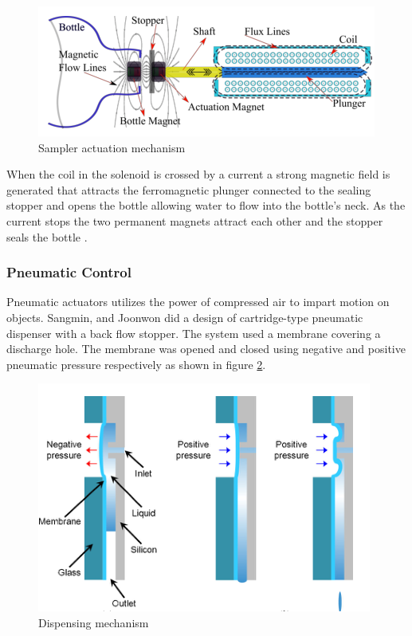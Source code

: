 \begin{figure}
    \centering
    \includegraphics{Figures/stopper.png}
    \caption[Sampler actuation mechanism]{Sampler actuation mechanism \cite{odetti2019design}}
    \label{fig:stopper}
\end{figure}

When the coil in the solenoid is crossed by a current a strong magnetic field is generated that attracts the ferromagnetic plunger connected to the sealing stopper and opens the bottle allowing water to flow into the bottle's neck. As the current stops the two permanent magnets attract each other and the stopper seals the bottle \cite{odetti2019design}.

\subsubsection{Pneumatic Control}
Pneumatic actuators utilizes the power of compressed air to impart motion on objects. Sangmin, and Joonwon \cite{lee2009development} did a design of cartridge-type pneumatic dispenser with a back flow stopper. The system used a membrane covering a discharge hole. The membrane was opened and closed using negative and positive pneumatic pressure respectively as shown in figure \ref{fig:dispensing_mechanisml}. 

\begin{figure}
    \centering
    \includegraphics{Figures/dispensing_mechanism.png}
    \caption[Dispensing mechanism]{Dispensing mechanism \cite{lee2009development}}
    \label{fig:dispensing_mechanisml}
\end{figure}

